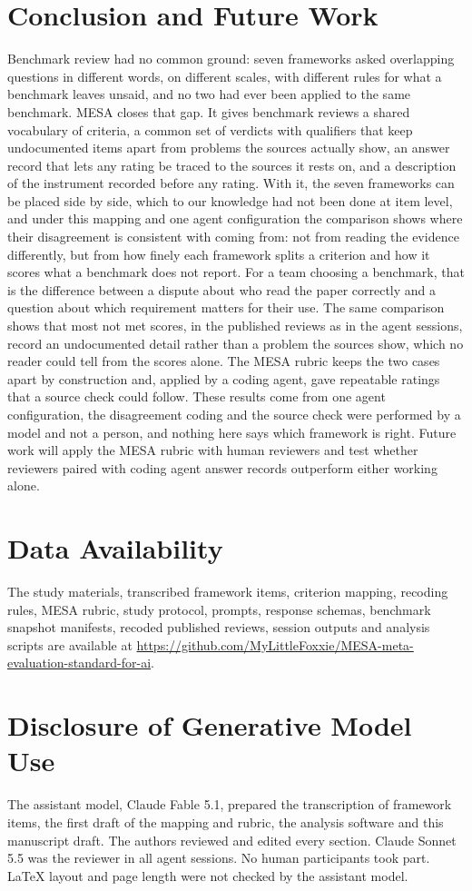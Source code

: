 \documentclass[10pt,conference]{IEEEtran}
\begin{document}
\section{Conclusion and Future Work}
Benchmark review had no common ground: seven frameworks asked overlapping questions in different words, on different scales, with different rules for what a benchmark leaves unsaid, and no two had ever been applied to the same benchmark. MESA closes that gap. It gives benchmark reviews a shared vocabulary of criteria, a common set of verdicts with qualifiers that keep undocumented items apart from problems the sources actually show, an answer record that lets any rating be traced to the sources it rests on, and a description of the instrument recorded before any rating. With it, the seven frameworks can be placed side by side, which to our knowledge had not been done at item level, and under this mapping and one agent configuration the comparison shows where their disagreement is consistent with coming from: not from reading the evidence differently, but from how finely each framework splits a criterion and how it scores what a benchmark does not report. For a team choosing a benchmark, that is the difference between a dispute about who read the paper correctly and a question about which requirement matters for their use. The same comparison shows that most not met scores, in the published reviews as in the agent sessions, record an undocumented detail rather than a problem the sources show, which no reader could tell from the scores alone. The MESA rubric keeps the two cases apart by construction and, applied by a coding agent, gave repeatable ratings that a source check could follow. These results come from one agent configuration, the disagreement coding and the source check were performed by a model and not a person, and nothing here says which framework is right. Future work will apply the MESA rubric with human reviewers and test whether reviewers paired with coding agent answer records outperform either working alone.
\section*{Data Availability}
The study materials, transcribed framework items, criterion mapping, recoding rules, MESA rubric, study protocol, prompts, response schemas, benchmark snapshot manifests, recoded published reviews, session outputs and analysis scripts are available at \url{https://github.com/MyLittleFoxxie/MESA-meta-evaluation-standard-for-ai}.

\section*{Disclosure of Generative Model Use}
The assistant model, Claude Fable 5.1, prepared the transcription of framework items, the first draft of the mapping and rubric, the analysis software and this manuscript draft. The authors reviewed and edited every section. Claude Sonnet 5.5 was the reviewer in all agent sessions. No human participants took part. LaTeX layout and page length were not checked by the assistant model.


\end{document}
